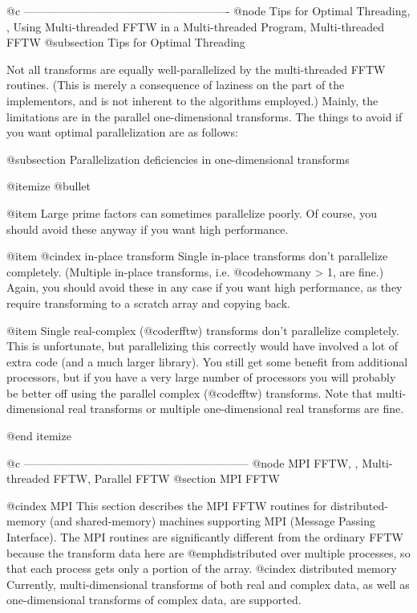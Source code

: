 @c -------------------------------------------------------
@node Tips for Optimal Threading,  , Using Multi-threaded FFTW in a Multi-threaded Program, Multi-threaded FFTW
@subsection Tips for Optimal Threading

Not all transforms are equally well-parallelized by the multi-threaded
FFTW routines.  (This is merely a consequence of laziness on the part of
the implementors, and is not inherent to the algorithms employed.)
Mainly, the limitations are in the parallel one-dimensional transforms.
The things to avoid if you want optimal parallelization are as follows:

@subsection Parallelization deficiencies in one-dimensional transforms

@itemize @bullet

@item
Large prime factors can sometimes parallelize poorly.  Of course, you
should avoid these anyway if you want high performance.

@item
@cindex in-place transform
Single in-place transforms don't parallelize completely.  (Multiple
in-place transforms, i.e. @code{howmany > 1}, are fine.)  Again, you
should avoid these in any case if you want high performance, as they
require transforming to a scratch array and copying back.

@item
Single real-complex (@code{rfftw}) transforms don't parallelize
completely.  This is unfortunate, but parallelizing this correctly would
have involved a lot of extra code (and a much larger library).  You
still get some benefit from additional processors, but if you have a
very large number of processors you will probably be better off using
the parallel complex (@code{fftw}) transforms.  Note that
multi-dimensional real transforms or multiple one-dimensional real
transforms are fine.

@end itemize

@c ------------------------------------------------------------
@node MPI FFTW,  , Multi-threaded FFTW, Parallel FFTW
@section MPI FFTW

@cindex MPI
This section describes the MPI FFTW routines for distributed-memory (and
shared-memory) machines supporting MPI (Message Passing Interface).  The
MPI routines are significantly different from the ordinary FFTW because
the transform data here are @emph{distributed} over multiple processes,
so that each process gets only a portion of the array.
@cindex distributed memory
Currently, multi-dimensional transforms of both real and complex data,
as well as one-dimensional transforms of complex data, are supported.

